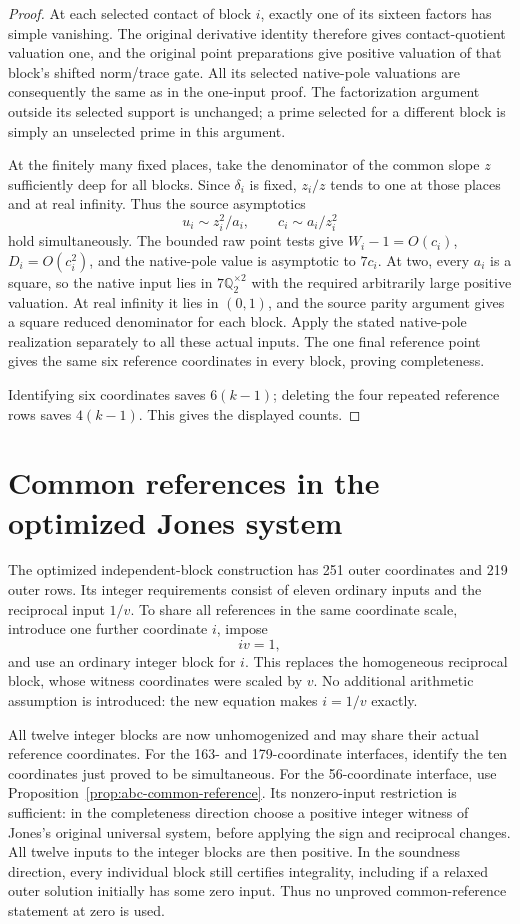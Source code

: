 \documentclass[11pt]{article}
\newcommand{\Q}{\mathbb Q}\newcommand{\Z}{\mathbb Z}
\begin{document}
\begin{proof}
At each selected contact of block \(i\), exactly one of its sixteen
factors has simple vanishing. The original derivative identity therefore
gives contact-quotient valuation one, and the original point preparations
give positive valuation of that block's shifted norm/trace gate. All its
selected native-pole valuations are consequently the same as in the
one-input proof. The factorization argument outside its selected support
is unchanged; a prime selected for a different block is simply an
unselected prime in this argument.

At the finitely many fixed places, take the denominator of the common
slope \(z\) sufficiently deep for all blocks. Since \(\delta_i\) is fixed,
\(z_i/z\) tends to one at those places and at real infinity. Thus the
source asymptotics
\[
                 u_i\sim z_i^2/a_i,\qquad c_i\sim a_i/z_i^2
\]
hold simultaneously. The bounded raw point tests give
\(W_i-1=O(c_i)\), \(D_i=O(c_i^2)\), and the native-pole value is
asymptotic to \(7c_i\). At two, every \(a_i\) is a square, so the native
input lies in \(7\Q_2^{\times2}\) with the required arbitrarily large
positive valuation. At real infinity it lies in \((0,1)\), and the source
parity argument gives a square reduced denominator for each block.
Apply the stated native-pole realization separately to all these actual
inputs. The one final reference point gives the same six reference
coordinates in every block, proving completeness.

Identifying six coordinates saves \(6(k-1)\); deleting the four repeated
reference rows saves \(4(k-1)\). This gives the displayed counts.
\end{proof}

\section{Common references in the optimized Jones system}
The optimized independent-block construction has 251 outer coordinates and
219 outer rows. Its integer requirements consist of eleven ordinary inputs
and the reciprocal input \(1/v\). To share all references in the same
coordinate scale, introduce one further coordinate \(i\), impose
\[
                              iv=1,
\]
and use an ordinary integer block for \(i\). This replaces the homogeneous
reciprocal block, whose witness coordinates were scaled by \(v\). No
additional arithmetic assumption is introduced: the new equation makes
\(i=1/v\) exactly.

All twelve integer blocks are now unhomogenized and may share their actual
reference coordinates. For the 163- and 179-coordinate interfaces, identify
the ten coordinates just proved to be simultaneous. For the 56-coordinate
interface, use Proposition~\ref{prop:abc-common-reference}. Its nonzero-input
restriction is sufficient: in the completeness direction choose a positive
integer witness of Jones's original universal system, before applying the
sign and reciprocal changes. All twelve inputs to the integer blocks are
then positive. In the soundness direction, every individual block still
certifies integrality, including if a relaxed outer solution initially has
some zero input. Thus no unproved common-reference statement at zero is
used.
\end{document}
